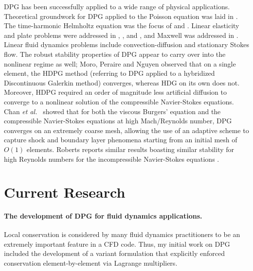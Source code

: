 \documentclass[letterpaper,12pt]{article}
\def\etal{{\it et al.~}}
\begin{document}
DPG has been successfully applied to a wide range of physical applications.  
Theoretical groundwork for DPG applied to the Poisson equation was laid in \cite{DPGPoisson}.  The time-harmonic Helmholtz equation was the focus of \cite{DPGHelmholtz, Gopalakrishnan2014} and \cite{DPG4}.  Linear elasticity and plate problems were addressed in \cite{BramwellDPG}, \cite{NiemiBramwellDemkowicz10}, and \cite{BramwellDemkowiczQiu10}, and Maxwell was addressed in \cite{DPGCloaking, WohlmuthReport}.  Linear fluid dynamics problems include convection-diffusion \cite{DPG3,DemkowiczHeuer,ChanHeuerThanhDemkowicz2012,Chan2013,EllisLC} and stationary Stokes flow\cite{DPGStokes,EllisLC}.
The robust stability properties of DPG appear to carry over into the nonlinear regime as well; Moro, Peraire and Nguyen observed \cite{MoroNguyenPeraire11, MoroMastersThesis} that on a single element, the HDPG method (referring to DPG applied to a hybridized Discontinuous Galerkin method) converges, whereas HDG on its own does not.  Moreover, HDPG required an order of magnitude less artificial diffusion to converge to a nonlinear solution of the compressible Navier-Stokes equations.  Chan \etal \cite{Chan2013dpg} showed that for both the viscous Burgers' equation and the compressible Navier-Stokes equations at high Mach/Reynolds number, DPG converges on an extremely coarse mesh, allowing the use of an adaptive scheme to capture shock and boundary layer phenomena starting from an initial mesh of $O(1)$ elements.  Roberts reports similar results boasting similar stability for high Reynolds numbers for the incompressible Navier-Stokes equations \cite{NateDissertation}.  

\section*{Current Research}
\paragraph{The development of DPG for fluid dynamics applications.}
Local conservation is considered by many fluid dynamics practitioners to be an extremely important feature in a CFD code. 
Thus, my initial work on DPG included the development of a variant formulation that explicitly enforced conservation element-by-element 
via Lagrange multipliers\cite{EllisLC}.
\end{document}
